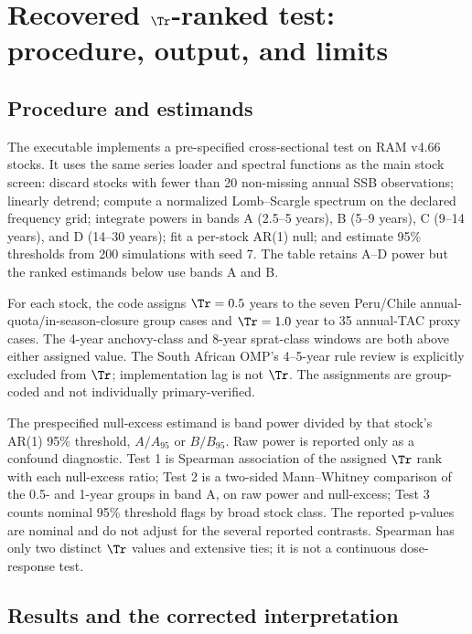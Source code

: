 \section{Recovered \texorpdfstring{\(\Tr\)}{Tr}-ranked test: procedure, output, and limits}\label{si:tr}

\subsection{Procedure and estimands}

The executable \texttt{} implements a pre-specified cross-sectional test on RAM v4.66 stocks. It uses the same series loader and spectral functions as the main stock screen: discard stocks with fewer than 20 non-missing annual SSB observations; linearly detrend; compute a normalized Lomb--Scargle spectrum on the declared frequency grid; integrate powers in bands A (2.5--5 years), B (5--9 years), C (9--14 years), and D (14--30 years); fit a per-stock AR(1) null; and estimate 95\% thresholds from 200 simulations with seed 7. The table retains A--D power but the ranked estimands below use bands A and B.

For each stock, the code assigns \(\Tr=0.5\) years to the seven Peru/Chile annual-quota/in-season-closure group cases and \(\Tr=1.0\) year to 35 annual-TAC proxy cases. The 4-year anchovy-class and 8-year sprat-class windows are both above either assigned value. The South African OMP's 4--5-year rule review is explicitly excluded from \(\Tr\); implementation lag is not \(\Tr\). The assignments are group-coded and not individually primary-verified.

The prespecified null-excess estimand is band power divided by that stock's AR(1) 95\% threshold, \(A/A_{95}\) or \(B/B_{95}\). Raw power is reported only as a confound diagnostic. Test 1 is Spearman association of the assigned \(\Tr\) rank with each null-excess ratio; Test 2 is a two-sided Mann--Whitney comparison of the 0.5- and 1-year groups in band A, on raw power and null-excess; Test 3 counts nominal 95\% threshold flags by broad stock class. The reported p-values are nominal and do not adjust for the several reported contrasts. Spearman has only two distinct \(\Tr\) values and extensive ties; it is not a continuous dose-response test.

\subsection{Results and the corrected interpretation}

